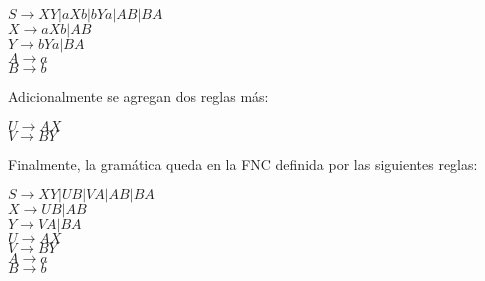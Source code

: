\documentclass[spanish]{article}
\def\ra{\rightarrow}
\begin{document}
\begin{center}
$S \ra XY|aXb|bYa|AB|BA$\\
$X \ra aXb|AB$\\
$Y \ra bYa|BA$\\
$A \ra a$\\
$B \ra b$
\end{center}
Adicionalmente se agregan dos reglas más:
\begin{center}
$U \ra AX$\\
$V \ra BY$
\end{center}
Finalmente, la gramática queda en la FNC definida por las siguientes reglas:
\begin{center}
$S \ra XY|UB|VA|AB|BA$\\
$X \ra UB|AB$\\
$Y \ra VA|BA$\\
$U \ra AX$\\
$V \ra BY$\\
$A \ra a$\\
$B \ra b$
\end{center}
\newpage
\end{document}
